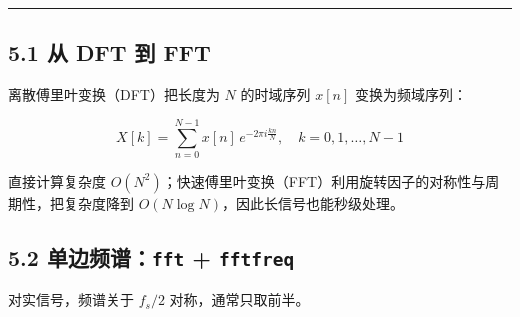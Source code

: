 \begin{center}\rule{0.5\linewidth}{0.5pt}\end{center}

\subsection{5.1 从 DFT 到 FFT}\label{ux4ece-dft-ux5230-fft}

离散傅里叶变换（DFT）把长度为 \(N\) 的时域序列 \(x[n]\) 变换为频域序列：

\[X[k]=\sum_{n=0}^{N-1}x[n]\,e^{-2\pi i\frac{kn}{N}},\quad k=0,1,\dots,N-1\]

直接计算复杂度
\(O(N^2)\)；快速傅里叶变换（FFT）利用旋转因子的对称性与周期性，把复杂度降到
\(O(N\log N)\)，因此长信号也能秒级处理。

\subsection{\texorpdfstring{5.2 单边频谱：\texttt{fft} +
\texttt{fftfreq}}{5.2 单边频谱：fft + fftfreq}}\label{ux5355ux8fb9ux9891ux8c31fft-fftfreq}

对实信号，频谱关于 \(f_s/2\) 对称，通常只取前半。

\begin{Shaded}
\begin{Highlighting}[]
\OperatorTok{=}\OperatorTok{=}\NormalTok{)}

\OperatorTok{=}           
\OperatorTok{=}               
\OperatorTok{=}\OperatorTok{*}\OperatorTok{=}\NormalTok{)}
\OperatorTok{=} \OperatorTok{*}\OperatorTok{*}\OperatorTok{*}\OperatorTok{*}

\OperatorTok{=}
\OperatorTok{=}\OperatorTok{/}
\OperatorTok{=} \OperatorTok{//}

\OperatorTok{=}\NormalTok{ xf[np.argmax(np.}\NormalTok{(yf[:N]))]}
\OperatorTok{=}\NormalTok{()}
\NormalTok{(}\SpecialCharTok{\{}\SpecialCharTok{\{}\NormalTok{)}
\end{Highlighting}
\end{Shaded}

